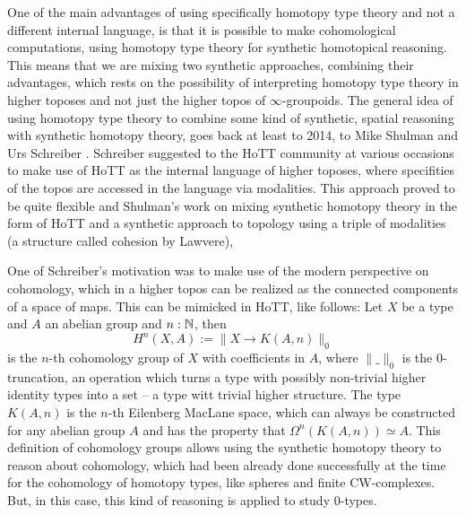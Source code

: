 One of the main advantages of using specifically homotopy type theory and not a different internal language,
is that it is possible to make cohomological computations, using homotopy type theory for synthetic homotopical reasoning.
This means that we are mixing two synthetic approaches, combining their advantages,
which rests on the possibility of interpreting homotopy type theory in higher toposes \cite{shulman2019all} and not just the higher topos of $\infty$-groupoids.
The general idea of using homotopy type theory to combine some kind of synthetic, spatial reasoning with synthetic homotopy theory, goes back at least to 2014, to Mike Shulman and Urs Schreiber \cite{Schreiber_2014}.
Schreiber suggested to the HoTT community at various occasions to make use of HoTT as the internal language of higher toposes, where specifities of the topos are accessed in the language via modalities.
This approach proved to be quite flexible and Shulman's \cite{shulman-Brouwer-fixed-point} work on mixing synthetic homotopy theory in the form of HoTT and a synthetic approach to topology using a triple of modalities (a structure called cohesion by Lawvere),

One of Schreiber's motivation was to make use of the modern perspective on cohomology, which in a higher topos can be realized as the connected components of a space of maps. This can be mimicked in HoTT, like follows: Let $X$ be a type and $A$ an abelian group and $n:\mathbb{N}$, then
\[ H^n(X,A):=\| X\to K(A,n) \|_0\]
is the $n$-th cohomology group of $X$ with coefficients in $A$, where $\|\_\|_0$ is the $0$-truncation, an operation which turns a type with possibly non-trivial higher identity types into a set -- a type witt trivial higher structure. The type $K(A,n)$ is the $n$-th Eilenberg MacLane space, which can always be constructed for any abelian group $A$ and has the property that $\Omega^n(K(A,n))\simeq A$.
This definition of cohomology groups allows using the synthetic homotopy theory to reason about cohomology, which had been already done successfully at the time for the cohomology of homotopy types, like spheres and finite CW-complexes. But, in this case, this kind of reasoning is applied to study $0$-types.

